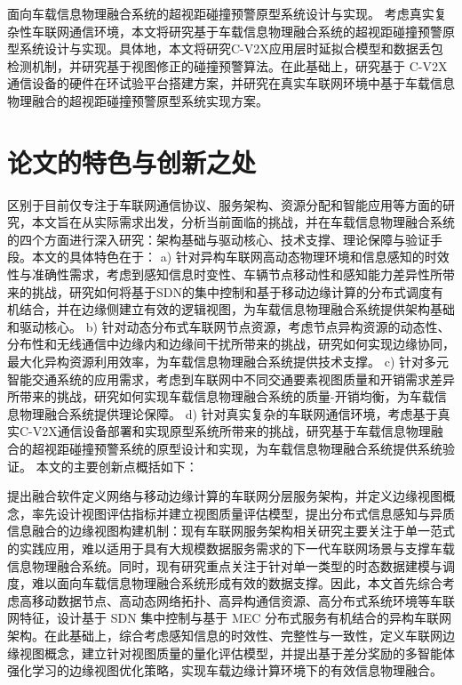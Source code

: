  面向车载信息物理融合系统的超视距碰撞预警原型系统设计与实现。
考虑真实复杂性车联网通信环境，本文将研究基于车载信息物理融合系统的超视距碰撞预警原型系统设计与实现。具体地，本文将研究C-V2X应用层时延拟合模型和数据丢包检测机制，并研究基于视图修正的碰撞预警算法。在此基础上，研究基于 C-V2X 通信设备的硬件在环试验平台搭建方案，并研究在真实车联网环境中基于车载信息物理融合的超视距碰撞预警原型系统实现方案。

\section{论文的特色与创新之处}\label{section 1-6}

区别于目前仅专注于车联网通信协议、服务架构、资源分配和智能应用等方面的研究，本文旨在从实际需求出发，分析当前面临的挑战，并在车载信息物理融合系统的四个方面进行深入研究：架构基础与驱动核心、技术支撑、理论保障与验证手段。本文的具体特色在于：
a) 针对异构车联网高动态物理环境和信息感知的时效性与准确性需求，考虑到感知信息时变性、车辆节点移动性和感知能力差异性所带来的挑战，研究如何将基于SDN的集中控制和基于移动边缘计算的分布式调度有机结合，并在边缘侧建立有效的逻辑视图，为车载信息物理融合系统提供架构基础和驱动核心。
b) 针对动态分布式车联网节点资源，考虑节点异构资源的动态性、分布性和无线通信中边缘内和边缘间干扰所带来的挑战，研究如何实现边缘协同，最大化异构资源利用效率，为车载信息物理融合系统提供技术支撑。
c) 针对多元智能交通系统的应用需求，考虑到车联网中不同交通要素视图质量和开销需求差异所带来的挑战，研究如何实现车载信息物理融合系统的质量-开销均衡，为车载信息物理融合系统提供理论保障。
d) 针对真实复杂的车联网通信环境，考虑基于真实C-V2X通信设备部署和实现原型系统所带来的挑战，研究基于车载信息物理融合的超视距碰撞预警系统的原型设计和实现，为车载信息物理融合系统提供系统验证。
本文的主要创新点概括如下：

 提出融合软件定义网络与移动边缘计算的车联网分层服务架构，并定义边缘视图概念，率先设计视图评估指标并建立视图质量评估模型，提出分布式信息感知与异质信息融合的边缘视图构建机制：现有车联网服务架构相关研究主要关注于单一范式的实践应用，难以适用于具有大规模数据服务需求的下一代车联网场景与支撑车载信息物理融合系统。同时，现有研究重点关注于针对单一类型的时态数据建模与调度，难以面向车载信息物理融合系统形成有效的数据支撑。因此，本文首先综合考虑高移动数据节点、高动态网络拓扑、高异构通信资源、高分布式系统环境等车联网特征，设计基于 SDN 集中控制与基于 MEC 分布式服务有机结合的异构车联网架构。在此基础上，综合考虑感知信息的时效性、完整性与一致性，定义车联网边缘视图概念，建立针对视图质量的量化评估模型，并提出基于差分奖励的多智能体强化学习的边缘视图优化策略，实现车载边缘计算环境下的有效信息物理融合。

